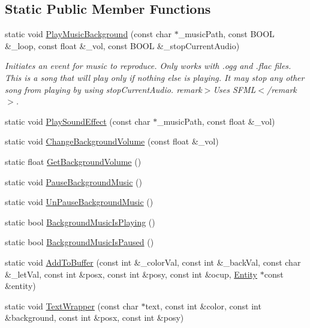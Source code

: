 \subsection*{Static Public Member Functions}
\begin{DoxyCompactItemize}
\item 
static void \hyperlink{classrl_util_j_m_ae639b58b2e2e5005713ddcc2fb8aae85}{Play\+Music\+Background} (const char $\ast$\+\_\+music\+Path, const B\+O\+OL \&\+\_\+loop, const float \&\+\_\+vol, const B\+O\+OL \&\+\_\+stop\+Current\+Audio)
\begin{DoxyCompactList}\small\item\em Initiates an event for music to reproduce. Only works with .ogg and .flac files. This is a song that will play only if nothing else is playing. It may stop any other song from playing by using stop\+Current\+Audio. remark$>$Uses S\+F\+ML$<$/remark$>$.\end{DoxyCompactList}\item 
static void \hyperlink{classrl_util_j_m_a5cc8ccacbff13db4c30a8062931abc8a}{Play\+Sound\+Effect} (const char $\ast$\+\_\+music\+Path, const float \&\+\_\+vol)
\item 
static void \hyperlink{classrl_util_j_m_adb79c17ae56d7250de66c4b3bbbc0100}{Change\+Background\+Volume} (const float \&\+\_\+vol)
\item 
static float \hyperlink{classrl_util_j_m_a5e87185e9a310fa7a062f3a9dc1a8fe4}{Get\+Background\+Volume} ()
\item 
static void \hyperlink{classrl_util_j_m_a5c644b24e7f40914588ecc68843558e9}{Pause\+Background\+Music} ()
\item 
static void \hyperlink{classrl_util_j_m_a98c9c78f103e273f0279f6fea63a5cbf}{Un\+Pause\+Background\+Music} ()
\item 
static bool \hyperlink{classrl_util_j_m_a0caa07e32aacb98dc10bff4d83c647c7}{Background\+Music\+Is\+Playing} ()
\item 
static bool \hyperlink{classrl_util_j_m_ac82d68787a3e359f545b4b6af149108e}{Background\+Music\+Is\+Paused} ()
\item 
static void \hyperlink{classrl_util_j_m_a0c75d3b77f530a1efcbd2e1a3be0957e}{Add\+To\+Buffer} (const int \&\+\_\+color\+Val, const int \&\+\_\+back\+Val, const char \&\+\_\+let\+Val, const int \&posx, const int \&posy, const int \&ocup, \hyperlink{class_entity}{Entity} $\ast$const \&entity)
\item 
static void \hyperlink{classrl_util_j_m_a43e3fa7db14af85ff8f5ed181951d594}{Text\+Wrapper} (const char $\ast$text, const int \&color, const int \&background, const int \&posx, const int \&posy)

\end{DoxyCompactItemize}
